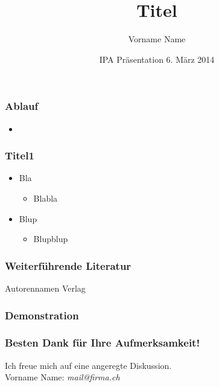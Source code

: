 \documentclass{beamer}
\title[Titel_short] %
{Titel}
\author{Vorname Name} %
\date%
{IPA Präsentation 6. März 2014}
\begin{document}
\frame{\titlepage}
\begin{frame}
\frametitle{Ablauf}
\begin{itemize}
	\item 
\end{itemize}
\end{frame}
\begin{frame}
 \frametitle{Titel1}
 \begin{itemize}
	 \item Bla
	 \begin{itemize}
		\item Blabla
	\end{itemize}
	\pause \item Blup
	\begin{itemize}
		\item Blupblup
	\end{itemize}
 \end{itemize}
\end{frame}

\begin{frame}%
  \frametitle{Weiterführende Literatur}    
  \begin{thebibliography}{10}    
  \beamertemplatearticlebibitems
    Autorennamen
    \newblock Verlag
 \beamertemplatearticlebibitems
  \end{thebibliography}
\end{frame}
\begin{frame}
\frametitle{Demonstration}

\end{frame}
\begin{frame}
\frametitle{Besten Dank für Ihre Aufmerksamkeit!}
Ich freue mich auf eine angeregte Diskussion.\\
Vorname Name: {\em mail@firma.ch}
\end{frame}



\end{document}
